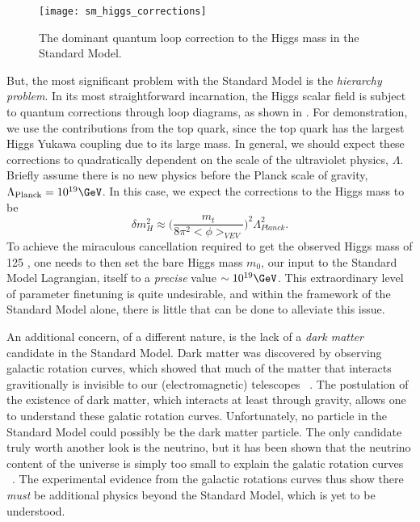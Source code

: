 \begin{figure}
\caption{The dominant quantum loop correction to the Higgs mass in the Standard Model.} \label{fig:sm_higgs_corrections}
\texttt{[image: sm\_higgs\_corrections]}
\end{figure}
But, the most significant problem with the Standard Model is the \textit{hierarchy problem}.
In its most straightforward incarnation, the Higgs scalar field is subject to quantum corrections through loop diagrams, as shown in .
For demonstration, we use the contributions from the top quark, since the top quark has the largest Higgs Yukawa coupling due to its large mass.
In general, we should expect these corrections to quadratically dependent on the scale of the ultraviolet physics, $\Lambda$.
Briefly assume there is no new physics before the Planck scale of gravity, $\Lambda_{\text{Planck}} = 10^{19} \GeV$.
In this case, we expect the corrections to the Higgs mass to be
\begin{equation}
\delta m^2_H \approx \Big( \frac{m_t}{8\pi^2 <\phi>_{VEV}} \Big)^2 \Lambda_{Planck}^2.
\end{equation}
To achieve the miraculous cancellation required to get the observed Higgs mass of 125 \GeV, one needs to then set the bare Higgs mass $m_0$, our input to the Standard Model Lagrangian, itself to a \textit{precise} value $\order 10^{19} \GeV$.
This extraordinary level of parameter finetuning is quite undesirable, and within the framework of the Standard Model alone, there is little that can be done to alleviate this issue.

An additional concern, of a different nature, is the lack of a \textit{dark matter} candidate in the Standard Model.
Dark matter was discovered by observing galactic rotation curves, which showed that much of the matter that interacts gravitionally is invisible to our (electromagnetic) telescopes ~\cite{Rubin:1970zza, Roberts:1970zza, Rubin:1980zd, Rubin:1985ze, Bosma:1981zz, Persic:1995ru, darkMatterPrimer}.
The postulation of the existence of dark matter, which interacts at least through gravity, allows one to understand these galatic rotation curves.
Unfortunately, no particle in the Standard Model could possibly be the dark matter particle.
The only candidate truly worth another look is the neutrino, but it has been shown that the neutrino content of the universe is simply too small to explain the galatic rotation curves ~\cite{Quigg:2008ab, darkMatterPrimer}.
The experimental evidence from the galactic rotations curves thus show there \textit{must} be additional physics beyond the Standard Model, which is yet to be understood.

